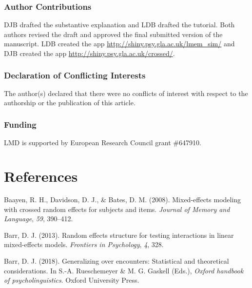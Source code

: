 \documentclass[english,doc,floatsintext]{apa6}
\begin{document}
\hypertarget{author-contributions}{%
\subsubsection{Author Contributions}\label{author-contributions}}

DJB drafted the substantive explanation and LDB drafted the tutorial. Both authors revised the draft and approved the final submitted version of the manuscript. LDB created the app \url{http://shiny.psy.gla.ac.uk/lmem_sim/} and DJB created the app \url{http://shiny.psy.gla.ac.uk/crossed/}.

\hypertarget{declaration-of-conflicting-interests}{%
\subsubsection{Declaration of Conflicting Interests}\label{declaration-of-conflicting-interests}}

The author(s) declared that there were no conflicts of interest with respect to the authorship or the publication of this article.

\hypertarget{funding}{%
\subsubsection{Funding}\label{funding}}

LMD is supported by European Research Council grant \#647910.

\newpage

\hypertarget{references}{%
\section{References}\label{references}}

\begingroup
\setlength{\parindent}{-0.5in}
\setlength{\leftskip}{0.5in}

\hypertarget{refs}{}
\leavevmode\hypertarget{ref-baayen_davidson_bates_2008}{}%
Baayen, R. H., Davidson, D. J., \& Bates, D. M. (2008). Mixed-effects modeling with crossed random effects for subjects and items. \emph{Journal of Memory and Language}, \emph{59}, 390--412.

\leavevmode\hypertarget{ref-barr_2013}{}%
Barr, D. J. (2013). Random effects structure for testing interactions in linear mixed-effects models. \emph{Frontiers in Psychology}, \emph{4}, 328.

\leavevmode\hypertarget{ref-barr_2018}{}%
Barr, D. J. (2018). Generalizing over encounters: Statistical and theoretical considerations. In S.-A. Rueschemeyer \& M. G. Gaskell (Eds.), \emph{Oxford handbook of psycholinguistics}. Oxford University Press.
\end{document}
